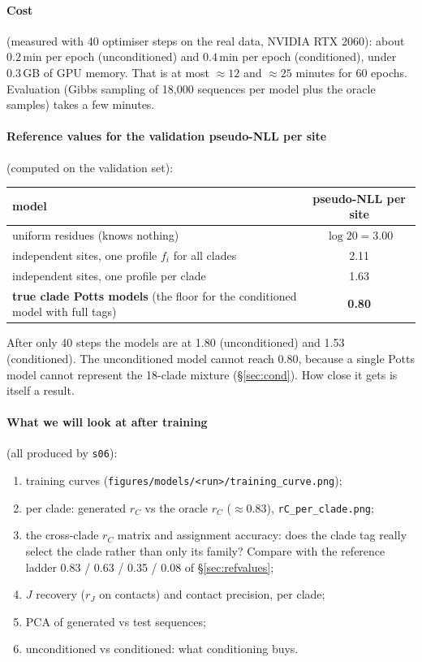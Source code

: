 \paragraph{Cost} (measured with 40 optimiser steps on the real data, NVIDIA RTX 2060): about
$0.2$\,min per epoch (unconditioned) and $0.4$\,min per epoch (conditioned), under 0.3\,GB of GPU memory.
That is at most $\approx12$ and $\approx25$ minutes for 60 epochs. Evaluation (Gibbs sampling of 18{,}000
sequences per model plus the oracle samples) takes a few minutes.

\paragraph{Reference values for the validation pseudo-NLL per site} (computed on the validation set):
\begin{center}\small
\begin{tabular}{lc}
\toprule
model & pseudo-NLL per site\\
\midrule
uniform residues (knows nothing) & $\log 20 = 3.00$\\
independent sites, one profile $f_i$ for all clades & 2.11\\
independent sites, one profile per clade & 1.63\\
\textbf{true clade Potts models} (the floor for the conditioned model with full tags) & \textbf{0.80}\\
\bottomrule
\end{tabular}
\end{center}
After only 40 steps the models are at 1.80 (unconditioned) and 1.53 (conditioned). The unconditioned model
cannot reach 0.80, because a single Potts model cannot represent the 18-clade mixture (\S\ref{sec:cond}). How
close it gets is itself a result.

\paragraph{What we will look at after training} (all produced by \texttt{s06}):
\begin{enumerate}[nosep]
\item training curves (\texttt{figures/models/<run>/training\_curve.png});
\item per clade: generated $r_C$ vs the oracle $r_C$ ($\approx0.83$), \texttt{rC\_per\_clade.png};
\item the cross-clade $r_C$ matrix and assignment accuracy: does the clade tag really select the clade
      rather than only its family? Compare with the reference ladder 0.83 / 0.63 / 0.35 / 0.08 of \S\ref{sec:refvalues};
\item $J$ recovery ($r_J$ on contacts) and contact precision, per clade;
\item PCA of generated vs test sequences;
\item unconditioned vs conditioned: what conditioning buys.
\end{enumerate}

